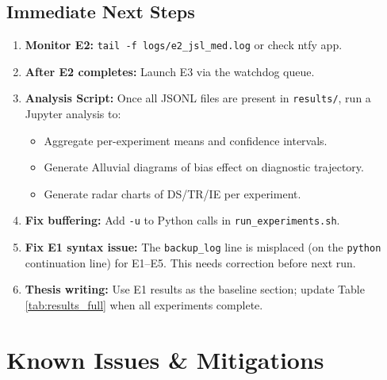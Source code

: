 \documentclass[12pt, a4paper]{article}
\begin{document}
\subsection{Immediate Next Steps}

\begin{enumerate}
    \item \textbf{Monitor E2:} \texttt{tail -f logs/e2\_jsl\_med.log} or check ntfy app.
    \item \textbf{After E2 completes:} Launch E3 via the watchdog queue.
    \item \textbf{Analysis Script:} Once all JSONL files are present in \texttt{results/}, run a Jupyter analysis to:
    \begin{itemize}
        \item Aggregate per-experiment means and confidence intervals.
        \item Generate Alluvial diagrams of bias effect on diagnostic trajectory.
        \item Generate radar charts of DS/TR/IE per experiment.
    \end{itemize}
    \item \textbf{Fix buffering:} Add \texttt{-u} to Python calls in \texttt{run\_experiments.sh}.
    \item \textbf{Fix E1 syntax issue:} The \texttt{backup\_log} line is misplaced (on the \texttt{python} continuation line) for E1--E5. This needs correction before next run.
    \item \textbf{Thesis writing:} Use E1 results as the baseline section; update Table \ref{tab:results_full} when all experiments complete.
\end{enumerate}

\section{Known Issues \& Mitigations}
\end{document}
